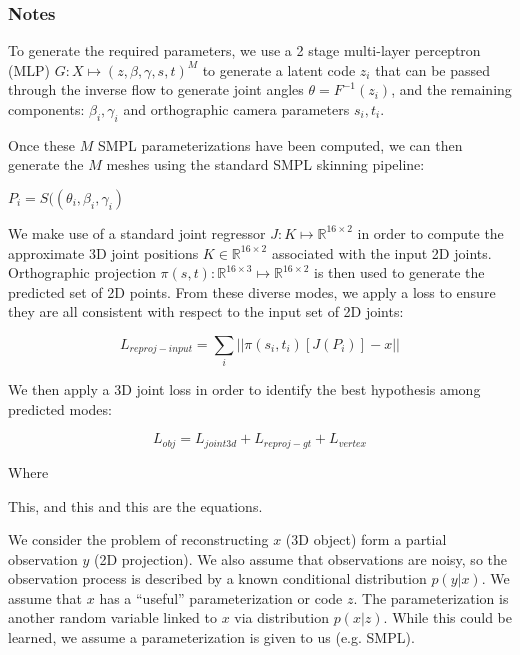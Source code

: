 
\subsubsection{Notes}


To generate the required parameters, we use a 2 stage multi-layer perceptron (MLP) $G: X \mapsto (z, \beta, \gamma, s, t)^{M}$ to generate a latent code $z_{i}$ that can be passed through the inverse flow to generate joint angles $\theta = F^{-1}(z_{i})$, and the remaining components: $\beta_{i}, \gamma_{i}$ and orthographic camera parameters $s_{i}, t_{i}$.

Once these $M$ SMPL parameterizations have been computed, we can then generate the $M$ meshes using the standard SMPL skinning pipeline:

$P_{i} = S((\theta_{i}, \beta_{i}, \gamma_{i})$

We make use of a standard joint regressor $J: K \mapsto \mathbb{R}^{16\times 2}$ in order to compute the approximate 3D joint positions $K \in \mathbb{R}^{16\times 2}$ associated with the input 2D joints. Orthographic projection $\pi(s, t): \mathbb{R}^{16\times 3} \mapsto \mathbb{R}^{16\times 2}$ is then used to generate the predicted set of 2D points.
From these diverse modes, we apply a loss to ensure they are all consistent with respect to the input set of 2D joints:

\begin{equation}
    L_{reproj-input} = \sum_i{|| \pi(s_{i}, t_{i})[J(P_{i})] - x||}
\end{equation}

We then apply a 3D joint loss in order to identify the best hypothesis among predicted modes:


\begin{equation}
    L_{obj} = L_{joint3d} + L_{reproj-gt} + L_{vertex}
\end{equation}

Where

This, and this and this are the equations.

We consider the problem of reconstructing $x$ (3D object) form a partial observation $y$ (2D projection).
We also assume that observations are noisy, so the observation process is described by a known conditional distribution $p(y|x)$.
We assume that $x$ has a ``useful'' parameterization or code $z$.
The parameterization is another random variable linked to $x$ via distribution $p(x|z)$.
While this could be learned, we assume a parameterization is given to us (e.g. SMPL).

